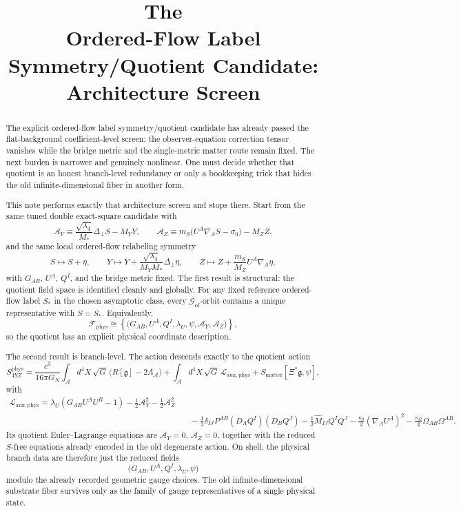 \documentclass[11pt]{article}
\title{\textbf{The \TheoryName{}}\\[0.4em]
\large Ordered-Flow Label Symmetry/Quotient Candidate: Architecture Screen}
\author{}
\date{}
\newcommand{\Sub}{\mathcal{A}}
\newcommand{\BridgeMetric}{\mathfrak{g}}
\newcommand{\AY}{\mathcal A_Y}
\newcommand{\AZ}{\mathcal A_Z}
\newcommand{\FieldSpace}{\mathscr F}
\newcommand{\PhysFieldSpace}{\FieldSpace_{\mathrm{phys}}}
\newcommand{\GaugeGroup}{\mathscr G_{\mathrm{of}}}
\begin{document}
\maketitle

\begin{abstract}
The explicit ordered-flow label symmetry/quotient candidate has already passed the flat-background coefficient-level screen: the observer-equation correction tensor vanishes while the bridge metric and the single-metric matter route remain fixed. The next burden is narrower and genuinely nonlinear. One must decide whether that quotient is an honest branch-level redundancy or only a bookkeeping trick that hides the old infinite-dimensional fiber in another form.

This note performs exactly that architecture screen and stops there. Start from the same tuned double exact-square candidate with
\[
\AY
\equiv
\frac{\sqrt{\lambda_4}}{M_*}\Delta_\perp S-M_YY,
\qquad
\AZ
\equiv
m_S\bigl(U^A\nabla_A S-\sigma_0\bigr)-M_ZZ,
\]
and the same local ordered-flow relabeling symmetry
\[
S\mapsto S+\eta,
\qquad
Y\mapsto Y+\frac{\sqrt{\lambda_4}}{M_YM_*}\Delta_\perp\eta,
\qquad
Z\mapsto Z+\frac{m_S}{M_Z}U^A\nabla_A\eta,
\]
with \(G_{AB}\), \(U^A\), \(Q^I\), and the bridge metric fixed. The first result is structural: the quotient field space is identified cleanly and globally. For any fixed reference ordered-flow label \(S_*\) in the chosen asymptotic class, every \(\GaugeGroup\)-orbit contains a unique representative with \(S=S_*\). Equivalently,
\[
\PhysFieldSpace
\cong
\left\{
\bigl(G_{AB},U^A,Q^I,\lambda_U,\psi,\AY,\AZ\bigr)
\right\},
\]
so the quotient has an explicit physical coordinate description.

The second result is branch-level. The action descends exactly to the quotient action
\[
S_{4YZ}^{\mathrm{phys}}
=
\frac{c^3}{16\pi G_N}
\int_{\Sub} d^4X\,\sqrt{G}\,\bigl(R[\BridgeMetric]-2\Lambda_{\Sub}\bigr)
+\int_{\Sub} d^4X\,\sqrt{G}\,\mathcal L_{\mathrm{aux,phys}}
+S_{\mathrm{matter}}[\Xi^*\BridgeMetric,\psi],
\]
with
\[
\begin{aligned}
\mathcal L_{\mathrm{aux,phys}}
=
\lambda_U(G_{AB}U^AU^B-1)
-\frac12\AY^2
-\frac12\AZ^2
\\
&\quad
-\frac12\delta_{IJ}P^{AB}(D_AQ^I)(D_BQ^J)
-\frac12\widehat M_{IJ}Q^IQ^J
-\frac{\kappa_\theta}{2}(\nabla_AU^A)^2
-\frac{\kappa_\Omega}{4}\Omega_{AB}\Omega^{AB}.
\end{aligned}
\]
Its quotient Euler--Lagrange equations are \(\AY=0\), \(\AZ=0\), together with the reduced \(S\)-free equations already encoded in the old degenerate action. On shell, the physical branch data are therefore just the reduced fields
\[
\bigl(G_{AB},U^A,Q^I,\lambda_U,\psi\bigr)
\]
modulo the already recorded geometric gauge choices. The old infinite-dimensional substrate fiber survives only as the family of gauge representatives of a single physical state.


\end{abstract}
\end{document}
